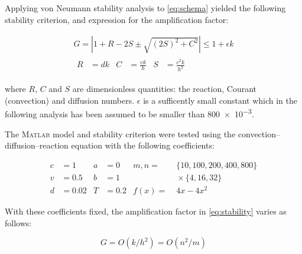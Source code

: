 \documentclass[a4paper,12pt,twocolumn]{article}
\begin{document}
Applying von Neumann stability analysis to \eqref{eq:schema} yielded the 
following stability criterion, and expression for the amplification factor:
\begin{footnotesize}
    \vspace{-0.5\baselineskip}
    \begin{gather}
        \label{eq:stability}
        G = \left| 1 + R - 2S \pm \sqrt{(2S)^2 + C^2} \right|
            \leq 1 + \epsilon k \\
        \nonumber
        \begin{aligned}
            R &= dk & C &= \frac{vk}{h} & S &= \frac{c^2k}{h^2}
        \end{aligned}
    \end{gather}
    \vspace{-1.5\baselineskip}
\end{footnotesize}

\hspace{-\parindent}where $R$, $C$ and $S$ are dimensionless quantities: the
reaction, Courant (convection) and diffusion numbers. $\epsilon$ is a
sufficently small constant which in the following analysis has been assumed to 
be smaller than \num{800e-3}.

The \textsc{Matlab} model and stability criterion were tested using the
convection--diffusion--reaction equation with the following coefficients:
\begin{footnotesize}
    \vspace{-0.5\baselineskip}
    \begin{align*}
        c &= 1    & a &= 0   & m,n  =&\;\{10,100,200,400,800\} \\
        v &= 0.5  & b &= 1   &       &\;\times \{4,16,32\} \\
        d &= 0.02 & T &= 0.2 & f(x) =&\;4x - 4x^2
    \end{align*}
    \vspace{-1.5\baselineskip}
\end{footnotesize}

With these coefficients fixed, the amplification factor in \eqref{eq:stability}
varies as follows:
\begin{footnotesize}
    \vspace{-0.5\baselineskip}
    \begin{equation} \label{eq:gain}
        G = O(k/h^2) = O(n^2/m)
    \end{equation}
    \vspace{-1.5\baselineskip}
\end{footnotesize}
\end{document}
